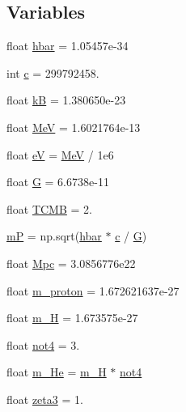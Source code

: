 \subsection*{Variables}
\begin{DoxyCompactItemize}
\item 
float \mbox{\hyperlink{namespacebbn_aa4b15a6720cfbfaebb9a8ba90c2d6615}{hbar}} = 1.\+05457e-\/34
\item 
int \mbox{\hyperlink{namespacebbn_ac2a771643cfcc5258e2d0a8d61096152}{c}} = 299792458.
\item 
float \mbox{\hyperlink{namespacebbn_ad8b80a31c3103c575ee91606b28c00b6}{kB}} = 1.\+380650e-\/23
\item 
float \mbox{\hyperlink{namespacebbn_a3a99f29ae890693870353fa67b0b034c}{MeV}} = 1.\+6021764e-\/13
\item 
float \mbox{\hyperlink{namespacebbn_a0747e524be761d23d14e43f4f45d522a}{eV}} = \mbox{\hyperlink{namespacebbn_a3a99f29ae890693870353fa67b0b034c}{MeV}} / 1e6
\item 
float \mbox{\hyperlink{namespacebbn_a52f93a6b9a98bb4b459145af6e1c0ffd}{G}} = 6.\+6738e-\/11
\item 
float \mbox{\hyperlink{namespacebbn_a45c7b6e0cda690af956e72f58b332e66}{T\+C\+MB}} = 2.
\item 
\mbox{\hyperlink{namespacebbn_a2de37c27807dd57d0dbea68a4f3992fa}{mP}} = np.\+sqrt(\mbox{\hyperlink{namespacebbn_aa4b15a6720cfbfaebb9a8ba90c2d6615}{hbar}} $\ast$ \mbox{\hyperlink{namespacebbn_ac2a771643cfcc5258e2d0a8d61096152}{c}} / \mbox{\hyperlink{namespacebbn_a52f93a6b9a98bb4b459145af6e1c0ffd}{G}})
\item 
float \mbox{\hyperlink{namespacebbn_a2c0a557eeaca292987c3ee7da6384295}{Mpc}} = 3.\+0856776e22
\item 
float \mbox{\hyperlink{namespacebbn_ac02aae5f2251db3c9b740d288330595d}{m\+\_\+proton}} = 1.\+672621637e-\/27
\item 
float \mbox{\hyperlink{namespacebbn_af144f84053152a233d6f7fe2f505589f}{m\+\_\+H}} = 1.\+673575e-\/27
\item 
float \mbox{\hyperlink{namespacebbn_a9ea8fb09e803dade7572cbbf146631cc}{not4}} = 3.
\item 
float \mbox{\hyperlink{namespacebbn_a5659e9c09b2847f14bb66c2d73e68191}{m\+\_\+\+He}} = \mbox{\hyperlink{namespacebbn_af144f84053152a233d6f7fe2f505589f}{m\+\_\+H}} $\ast$ \mbox{\hyperlink{namespacebbn_a9ea8fb09e803dade7572cbbf146631cc}{not4}}
\item 
float \mbox{\hyperlink{namespacebbn_a43d9d2d8599e22e361b96747ee7210fe}{zeta3}} = 1.

\end{DoxyCompactItemize}
